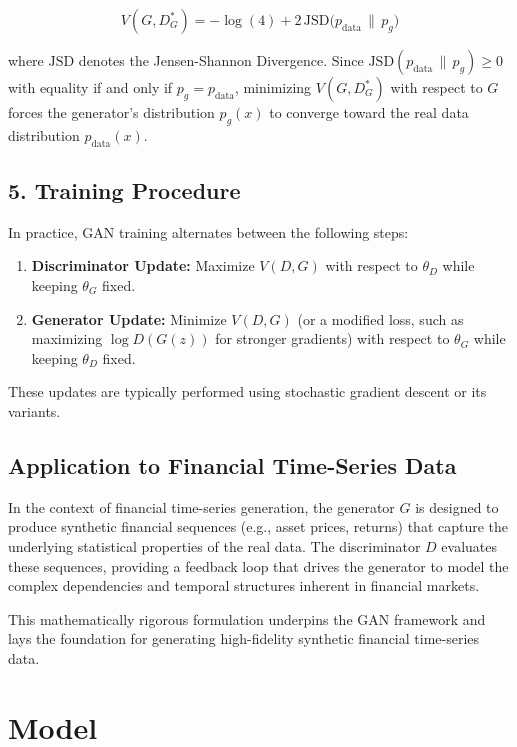 \documentclass{article}
\begin{document}
\begin{equation}
    V(G, D^*_G) = -\log(4) + 2\, \mathrm{JSD}\big(p_{\text{data}} \,\|\, p_g\big)
\end{equation}

where $ \mathrm{JSD} $ denotes the Jensen-Shannon Divergence. Since $ \mathrm{JSD}(p_{\text{data}} \,\|\, p_g) \geq 0 $ with equality if and only if $ p_g = p_{\text{data}} $, minimizing $ V(G, D^*_G) $ with respect to $ G $ forces the generator’s distribution $ p_g(x) $ to converge toward the real data distribution $ p_{\text{data}}(x) $.

\subsection*{5. Training Procedure}

In practice, GAN training alternates between the following steps:
\begin{enumerate}
    \item \textbf{Discriminator Update:}
    Maximize $ V(D, G) $ with respect to $ \theta_D $ while keeping $ \theta_G $ fixed.

    \item \textbf{Generator Update:}
    Minimize $ V(D, G) $ (or a modified loss, such as maximizing $ \log D(G(z)) $ for stronger gradients) with respect to $ \theta_G $ while keeping $ \theta_D $ fixed.
\end{enumerate}

These updates are typically performed using stochastic gradient descent or its variants.

\subsection*{Application to Financial Time-Series Data}

In the context of financial time-series generation, the generator $ G $ is designed to produce synthetic financial sequences (e.g., asset prices, returns) that capture the underlying statistical properties of the real data. The discriminator $ D $ evaluates these sequences, providing a feedback loop that drives the generator to model the complex dependencies and temporal structures inherent in financial markets.

This mathematically rigorous formulation underpins the GAN framework and lays the foundation for generating high-fidelity synthetic financial time-series data.

\section{Model}
\end{document}
